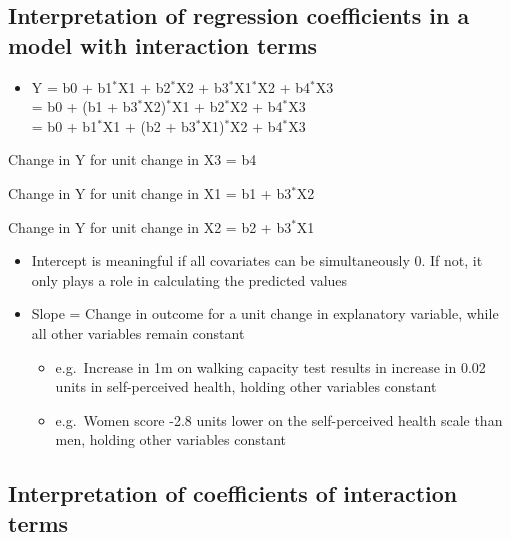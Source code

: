 \documentclass[
]{book}
\providecommand{\tightlist}{%
  \setlength{\itemsep}{0pt}\setlength{\parskip}{0pt}}
\begin{document}
\hypertarget{interpretation-of-regression-coefficients-in-a-model-with-interaction-terms}{%
\subsection{Interpretation of regression coefficients in a model with interaction terms}\label{interpretation-of-regression-coefficients-in-a-model-with-interaction-terms}}

\begin{itemize}
\tightlist
\item
  Y = b0 + b1\(^*\)X1 + b2\(^*\)X2 + b3\(^*\)X1\(^*\)X2 + b4\(^*\)X3\\
  = b0 + (b1 + b3\(^*\)X2)\(^*\)X1 + b2\(^*\)X2 + b4\(^*\)X3\\
  = b0 + b1\(^*\)X1 + (b2 + b3\(^*\)X1)\(^*\)X2 + b4\(^*\)X3
\end{itemize}

Change in Y for unit change in X3 = b4

Change in Y for unit change in X1 = b1 + b3\(^*\)X2

Change in Y for unit change in X2 = b2 + b3\(^*\)X1

\begin{itemize}
\tightlist
\item
  Intercept is meaningful if all covariates can be simultaneously 0. If not, it only plays a role in calculating the predicted values
\item
  Slope = Change in outcome for a unit change in explanatory variable, while all other variables remain constant

  \begin{itemize}
  \tightlist
  \item
    e.g.~Increase in 1m on walking capacity test results in increase in 0.02 units in self-perceived health, holding other variables constant
  \item
    e.g.~Women score -2.8 units lower on the self-perceived health scale than men, holding other variables constant
  \end{itemize}
\end{itemize}

\hypertarget{interpretation-of-coefficients-of-interaction-terms}{%
\subsection{Interpretation of coefficients of interaction terms}\label{interpretation-of-coefficients-of-interaction-terms}}
\end{document}
